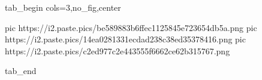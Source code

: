  
 
 
 
 


\ifcmt
  tab_begin cols=3,no_fig,center

     pic https://i2.paste.pics/be589883b6ffec1125845e723654db5a.png
		 pic https://i2.paste.pics/14ea0281331ecdad238c38ed35378416.png
		 pic https://i2.paste.pics/c2ed977c2e443555f6662ce62b315767.png

  tab_end
\fi
